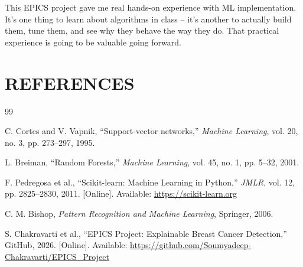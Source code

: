 \documentclass[12pt]{article}
\begin{document}
This EPICS project gave me real hands-on experience with ML implementation. It's one thing to learn about algorithms in class -- it's another to actually build them, tune them, and see why they behave the way they do. That practical experience is going to be valuable going forward.

\newpage
\section*{REFERENCES} %

\begin{thebibliography}{99}

C. Cortes and V. Vapnik, ``Support-vector networks,'' \textit{Machine Learning}, vol. 20, no. 3, pp. 273--297, 1995.

L. Breiman, ``Random Forests,'' \textit{Machine Learning}, vol. 45, no. 1, pp. 5--32, 2001.

F. Pedregosa et al., ``Scikit-learn: Machine Learning in Python,'' \textit{JMLR}, vol. 12, pp. 2825--2830, 2011. [Online]. Available: \url{https://scikit-learn.org}

C. M. Bishop, \textit{Pattern Recognition and Machine Learning}, Springer, 2006.

S. Chakravarti et al., ``EPICS Project: Explainable Breast Cancer Detection,'' GitHub, 2026. [Online]. Available: \url{https://github.com/Soumyadeep-Chakravarti/EPICS_Project}

\end{thebibliography}
\end{document}

